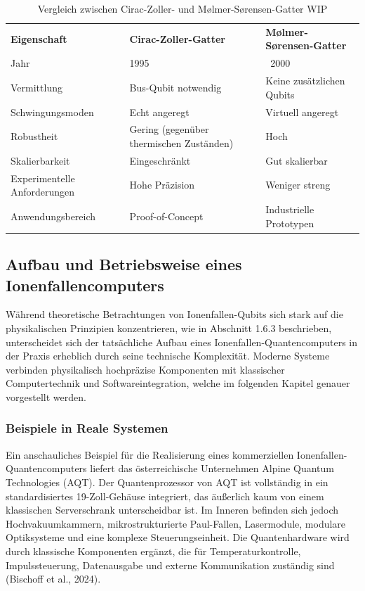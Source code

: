 \begin{table}[ht]
    \centering
    \caption{Vergleich zwischen Cirac-Zoller- und Mølmer-Sørensen-Gatter WIP}
    \label{tab:vergleich_gatter}
    \begin{tabular}{p{4.5cm} p{5.5cm} p{5.5cm}}
        \textbf{Eigenschaft} & \textbf{Cirac-Zoller-Gatter} & \textbf{Mølmer-Sørensen-Gatter} \\
        Jahr & 1995 & ~2000 \\
        Vermittlung & Bus-Qubit notwendig & Keine zusätzlichen Qubits \\
        Schwingungsmoden & Echt angeregt & Virtuell angeregt \\
        Robustheit & Gering (gegenüber thermischen Zuständen) & Hoch \\
        Skalierbarkeit & Eingeschränkt & Gut skalierbar \\
        Experimentelle Anforderungen & Hohe Präzision & Weniger streng \\
        Anwendungsbereich & Proof-of-Concept & Industrielle Prototypen \\
    \end{tabular}
\end{table}


\subsection{Aufbau und Betriebsweise eines Ionenfallencomputers}

Während theoretische Betrachtungen von Ionenfallen-Qubits sich stark auf die physikalischen Prinzipien konzentrieren, wie in Abschnitt 1.6.3 beschrieben, unterscheidet sich der tatsächliche Aufbau eines Ionenfallen-Quantencomputers in der Praxis erheblich durch seine technische Komplexität. Moderne Systeme verbinden physikalisch hochpräzise Komponenten mit klassischer Computertechnik und Softwareintegration, welche im folgenden Kapitel genauer vorgestellt werden.
\subsubsection{Beispiele in Reale Systemen}

Ein anschauliches Beispiel für die Realisierung eines kommerziellen Ionenfallen-Quantencomputers liefert das österreichische Unternehmen Alpine Quantum Technologies (AQT). Der Quantenprozessor von AQT ist vollständig in ein standardisiertes 19-Zoll-Gehäuse integriert, das äußerlich kaum von einem klassischen Serverschrank unterscheidbar ist. Im Inneren befinden sich jedoch Hochvakuumkammern, mikrostrukturierte Paul-Fallen, Lasermodule, modulare Optiksysteme und eine komplexe Steuerungseinheit. Die Quantenhardware wird durch klassische Komponenten ergänzt, die für Temperaturkontrolle, Impulssteuerung, Datenausgabe und externe Kommunikation zuständig sind (Bischoff et al., 2024).

